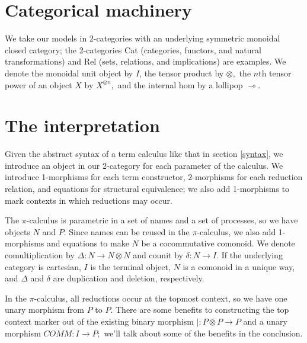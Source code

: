 \documentclass[]{acm_proc_article-sp}
\newcommand{\maps}{\colon}
\numberwithin{equation}{subsection}
\newcommand{\pic}{$\pi$-calculus}
\begin{document}
\section{Categorical machinery}

We take our models in 2-categories with an underlying symmetric monoidal closed category; the 2-categories Cat (categories, functors, and natural transformations) and Rel (sets, relations, and implications) are examples.  We denote the monoidal unit object by $I$, the tensor product by $\otimes,$ the $n$th tensor power of an object $X$ by $X^{\otimes n},$ and the internal hom by a lollipop $\multimap$.

\section{The interpretation}

Given the abstract syntax of a term calculus like that in section \ref{syntax}, we introduce an object in our 2-category for each parameter of the calculus.  We introduce 1-morphisms for each term constructor, 2-morphisms for each reduction relation, and equations for structural equivalence; we also add 1-morphisms to mark contexts in which reductions may occur.

The {\pic} is parametric in a set of names and a set of processes, so we have objects $N$ and $P$.  Since names can be reused in the {\pic,} we also add 1-morphisms and equations to make $N$ be a cocommutative comonoid.  We denote comultiplication by $\Delta\maps N \to N \otimes N$ and counit by $\delta\maps N \to I.$  If the underlying category is cartesian, $I$ is the terminal object, $N$ is a comonoid in a unique way, and $\Delta$ and $\delta$ are duplication and deletion, respectively.  

In the {\pic,} all reductions occur at the topmost context, so we have one unary morphism from $P$ to $P$.  There are some benefits to constructing the top context marker out of the existing binary morphism $|\maps P \otimes P \to P$ and a unary morphism $COMM\maps I \to P;$ we'll talk about some of the benefits in the conclusion.
\end{document}
